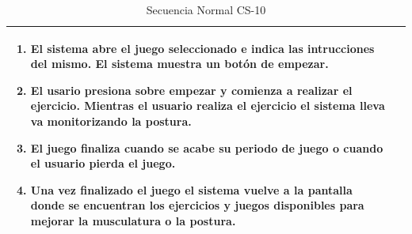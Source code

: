 \begin{table}[h!]
\begin{tabular}{ |m{4cm}|m{11cm}|  }
\begin{enumerate}
                \item El sistema abre el juego seleccionado e indica las intrucciones del mismo. El sistema muestra un botón de empezar.
                \item El usario presiona sobre empezar y comienza a realizar el ejercicio. Mientras el usuario realiza el ejercicio el sistema lleva va monitorizando la postura.
			\item El juego finaliza cuando se acabe su periodo de juego o cuando el usuario pierda el juego. 
                \item Una vez finalizado el juego el sistema vuelve a la pantalla donde se encuentran los ejercicios y juegos disponibles para mejorar la musculatura o la postura. 
		\end{enumerate}\\
\hline

\end{tabular}
\caption{Secuencia Normal CS-10}
\label{SecNormalCS10}
\end{table}

